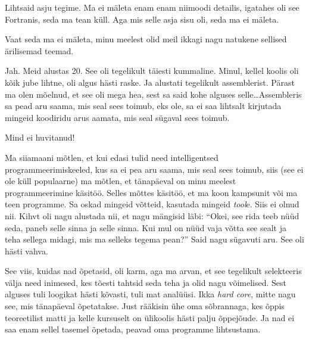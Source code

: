 Lihtsaid asju tegime. Ma ei mäleta enam enam niimoodi detailis, igatahes oli 
see Fortranis, seda ma tean küll. Aga mis selle asja sisu oli, 
seda ma ei mäleta. 


Vaat seda ma ei mäleta, minu meelest olid meil ikkagi nagu natukene sellised 
ärilisemad teemad. 


Jah. Meid alustas 20. See oli tegelikult täiesti kummaline. Minul, kellel 
koolis oli kõik jube lihtne, oli algus hästi raske. Ja alustati tegelikult 
assemblerist. Pärast ma olen mõelnud, et see oli mega hea, 
sest sa said kohe alguses selle\ldots Assembleris  sa pead aru saama, mis seal 
sees toimub, eks ole, sa ei saa lihtsalt kirjutada mingeid koodiridu arus 
aamata, mis seal sügaval sees toimub. 


Mind ei huvitanud!


Ma siiamaani mõtlen, et kui edasi tulid need intelligentsed 
programmeerimiskeeled, kus sa ei pea  aru saama, mis seal sees toimub, siis 
(see ei ole küll populaarne) ma mõtlen, et tänapäeval on minu meelest 
programmeerimine käsitöö. Selles mõttes käsitöö, et ma koon kampsunit või ma 
teen programme. Sa oskad mingeid võtteid,  kasutada mingeid \emph{tool}e. Siis 
ei olnud nii. Kihvt oli nagu alustada nii, et nagu mängisid läbi: 
\enquote{Okei, see rida teeb nüüd seda, paneb selle sinna ja selle sinna. Kui 
mul on nüüd vaja võtta see sealt ja teha sellega midagi, mis ma selleks tegema 
pean?} Said nagu sügavuti aru. See oli hästi vahva. 

See viis, kuidas nad õpetasid, oli karm, aga ma arvan, et see tegelikult 
selekteeris välja need inimesed, kes tõesti tahtsid seda teha ja olid nagu 
võimelised. Sest  alguses tuli loogikat hästi kõvasti, tuli mat analüüsi. Ikka 
\emph{hard core}, mitte nagu see, mis tänapäeval õpetatakse. Just rääkisin ühe 
oma sõbrannaga, kes õppis teoreetilist matti ja kelle kursuselt on ülikoolis 
hästi palju õppejõude. Ja nad ei saa enam sellel tasemel õpetada, peavad oma 
programme lihtsustama. 


